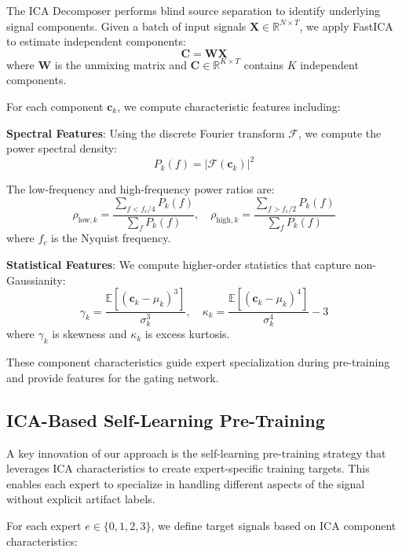 \documentclass[journal]{IEEEtran}
\begin{document}
The ICA Decomposer performs blind source separation to identify underlying signal components. Given a batch of input signals $\mathbf{X} \in \mathbb{R}^{N \times T}$, we apply FastICA \cite{hyvarinen1999fast} to estimate independent components:
\begin{equation}
\mathbf{C} = \mathbf{W}\mathbf{X}
\end{equation}
where $\mathbf{W}$ is the unmixing matrix and $\mathbf{C} \in \mathbb{R}^{K \times T}$ contains $K$ independent components.

For each component $\mathbf{c}_k$, we compute characteristic features including:

\textbf{Spectral Features}: Using the discrete Fourier transform $\mathcal{F}$, we compute the power spectral density:
\begin{equation}
P_k(f) = |\mathcal{F}(\mathbf{c}_k)|^2
\end{equation}

The low-frequency and high-frequency power ratios are:
\begin{equation}
\rho_{\text{low},k} = \frac{\sum_{f < f_c/4} P_k(f)}{\sum_f P_k(f)}, \quad \rho_{\text{high},k} = \frac{\sum_{f > f_c/2} P_k(f)}{\sum_f P_k(f)}
\end{equation}
where $f_c$ is the Nyquist frequency.

\textbf{Statistical Features}: We compute higher-order statistics that capture non-Gaussianity:
\begin{equation}
\gamma_k = \frac{\mathbb{E}[(\mathbf{c}_k - \mu_k)^3]}{\sigma_k^3}, \quad \kappa_k = \frac{\mathbb{E}[(\mathbf{c}_k - \mu_k)^4]}{\sigma_k^4} - 3
\end{equation}
where $\gamma_k$ is skewness and $\kappa_k$ is excess kurtosis.

These component characteristics guide expert specialization during pre-training and provide features for the gating network.

\subsection{ICA-Based Self-Learning Pre-Training}

A key innovation of our approach is the self-learning pre-training strategy that leverages ICA characteristics to create expert-specific training targets. This enables each expert to specialize in handling different aspects of the signal without explicit artifact labels.

For each expert $e \in \{0, 1, 2, 3\}$, we define target signals based on ICA component characteristics:
\end{document}
